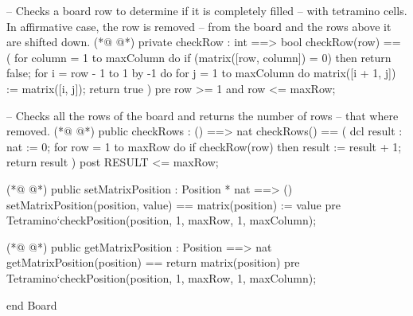 \begin{vdmpp}[breaklines=true]
  -- Checks a board row to determine if it is completely filled
  -- with tetramino cells. In affirmative case, the row is removed
  -- from the board and the rows above it are shifted down.
(*@
\label{checkRow:105}
@*)
  private checkRow : int ==> bool
  checkRow(row) == (
   for column = 1 to maxColumn do
    if (matrix([row, column]) = 0) then return false;
   for i = row - 1 to 1 by -1 do
    for j = 1 to maxColumn do
     matrix([i + 1, j]) := matrix([i, j]);
   return true
  )
  pre row >= 1 and row <= maxRow;
  
  -- Checks all the rows of the board and returns the number of rows
  -- that where removed.
(*@
\label{checkRows:118}
@*)
  public checkRows : () ==> nat
  checkRows() == (
   dcl result : nat := 0;
   for row = 1 to maxRow do
    if checkRow(row) then result := result + 1;
   return result
  )
  post RESULT <= maxRow;
  
(*@
\label{setMatrixPosition:127}
@*)
  public setMatrixPosition : Position * nat ==> ()
  setMatrixPosition(position, value) ==
   matrix(position) := value
  pre Tetramino`checkPosition(position, 1, maxRow, 1, maxColumn);
  
(*@
\label{getMatrixPosition:132}
@*)
  public getMatrixPosition : Position ==> nat
  getMatrixPosition(position) ==
   return matrix(position)  
  pre Tetramino`checkPosition(position, 1, maxRow, 1, maxColumn);
 
end Board
\end{vdmpp}
